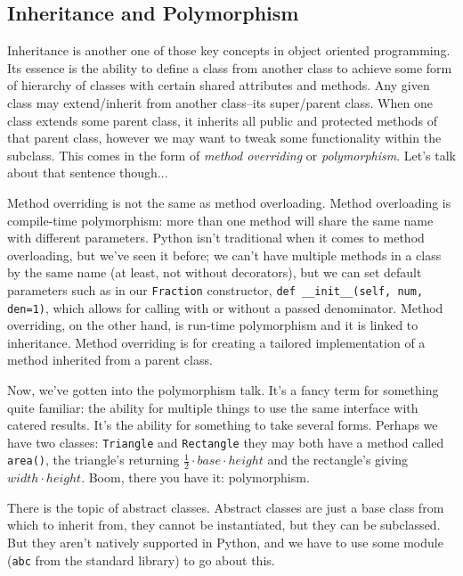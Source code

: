 \documentclass[11pt, twoside, reqno]{book}
\begin{document}
\subsection{Inheritance and Polymorphism}

Inheritance is another one of those key concepts in object oriented programming. Its essence is the ability to define a class from another class to achieve some form of hierarchy of classes with certain shared attributes and methods. Any given class may extend/inherit from another class--its super/parent class. When one class extends some parent class, it inherits all public and protected methods of that parent class, however we may want to tweak some functionality within the subclass. This comes in the form of \textit{method overriding} or \textit{polymorphism}. Let's talk about that sentence though...

Method overriding is not the same as method overloading. Method overloading is compile-time polymorphism: more than one method will share the same name with different parameters. Python isn't traditional when it comes to method overloading, but we've seen it before; we can't have multiple methods in a class by the same name (at least, not without decorators), but we can set default parameters such as in our \texttt{Fraction} constructor, \texttt{def \_\_init\_\_(self, num, den=1)}, which allows for calling with or without a passed denominator. Method overriding, on the other hand, is run-time polymorphism and it is linked to inheritance. Method overriding is for creating a tailored implementation of a method inherited from a parent class.

Now, we've gotten into the polymorphism talk. It's a fancy term for something quite familiar: the ability for multiple things to use the same interface with catered results. It's the ability for something to take several forms. Perhaps we have two classes: \texttt{Triangle} and \texttt{Rectangle} they may both have a method called \texttt{area()}, the triangle's returning $\frac{1}{2} \cdot base \cdot height$ and the rectangle's giving $width \cdot height$. Boom, there you have it: polymorphism.

There is the topic of abstract classes. Abstract classes are just a base class from which to inherit from, they cannot be instantiated, but they can be subclassed. But they aren't natively supported in Python, and we have to use some module (\texttt{abc} from the standard library) to go about this.
\end{document}
